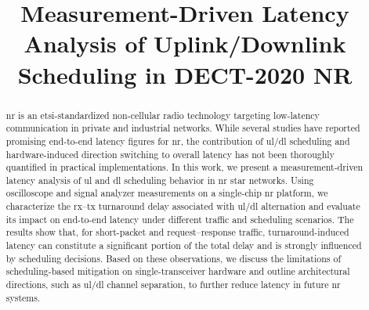 \documentclass[conference]{IEEEtran}
\begin{document}
\title{Measurement-Driven Latency Analysis of Uplink/Downlink Scheduling in DECT-2020 NR
 }

\author{
\and
{}
\and
{}
}

\maketitle

\begin{abstract}

\gls{nr} is an \gls{etsi}-standardized non-cellular radio technology targeting low-latency communication in private and industrial networks. While several studies have reported promising end-to-end latency figures for \gls{nr}, the contribution of \gls{ul}/\gls{dl} scheduling and hardware-induced direction switching to overall latency has not been thoroughly quantified in practical implementations. In this work, we present a measurement-driven latency analysis of \gls{ul} and \gls{dl} scheduling behavior in \gls{nr} star networks. Using oscilloscope and signal analyzer measurements on a single-chip \gls{nr} platform, we characterize the \gls{rx}--\gls{tx} turnaround delay associated with \gls{ul}/\gls{dl} alternation and evaluate its impact on end-to-end latency under different traffic and scheduling scenarios. The results show that, for short-packet and request--response traffic, turnaround-induced latency can constitute a significant portion of the total delay and is strongly influenced by scheduling decisions. Based on these observations, we discuss the limitations of scheduling-based mitigation on single-transceiver hardware and outline architectural directions, such as \gls{ul}/\gls{dl} channel separation, to further reduce latency in future \gls{nr} systems.
\end{abstract}
\end{document}
